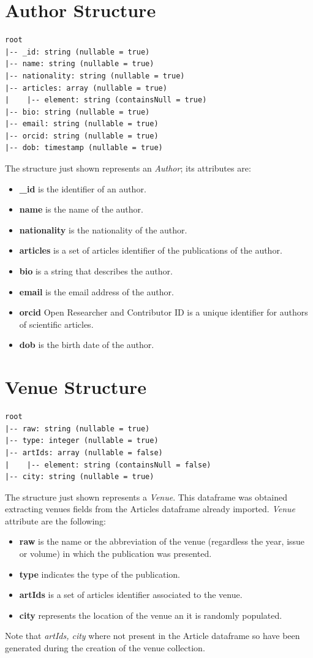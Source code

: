 \documentclass{Configuration_Files/PoliMi3i_thesis}
\begin{document}
\section{Author Structure}
\begin{lstlisting}
root
|-- _id: string (nullable = true)
|-- name: string (nullable = true)
|-- nationality: string (nullable = true)
|-- articles: array (nullable = true)
|    |-- element: string (containsNull = true)
|-- bio: string (nullable = true)
|-- email: string (nullable = true)
|-- orcid: string (nullable = true)
|-- dob: timestamp (nullable = true)
\end{lstlisting}
The structure just shown represents an \emph{Author}; its attributes are:
\begin{itemize}
    \item \textbf{\_id} is the identifier of an author.
    \item \textbf{name} is the name of the author.
    \item \textbf{nationality} is the nationality of the author.
    \item \textbf{articles} is a set of articles identifier of the publications of the author.
    \item \textbf{bio} is a string that describes the author.
    \item \textbf{email} is the email address of the author.
    \item \textbf{orcid} Open Researcher and Contributor ID is a unique identifier for authors of scientific articles.
    \item \textbf{dob} is the birth date of the author.
\end{itemize}

\section{Venue Structure}
\begin{lstlisting}
root
|-- raw: string (nullable = true)
|-- type: integer (nullable = true)
|-- artIds: array (nullable = false)
|    |-- element: string (containsNull = false)
|-- city: string (nullable = true)
\end{lstlisting}
The structure just shown represents a \emph{Venue}. This dataframe was obtained extracting venues fields from the Articles dataframe already imported. \emph{Venue} attribute are the following:
\begin{itemize}
    \item \textbf{raw} is the name or the abbreviation of the venue (regardless the year, issue or volume) in which the
        publication was presented.
    \item \textbf{type} indicates the type of the publication.
    \item \textbf{artIds} is a set of articles identifier associated to the venue.
    \item \textbf{city} represents the location of the venue an it is randomly populated.
\end{itemize}
Note that \emph{artIds, city} where not present in the Article dataframe so have been generated during the creation of the venue collection. 
\end{document}
